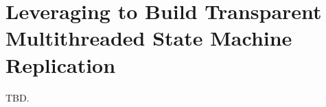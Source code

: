 \section{Leveraging \smt to Build Transparent Multithreaded State Machine Replication} \label{sec:replication}

TBD.
